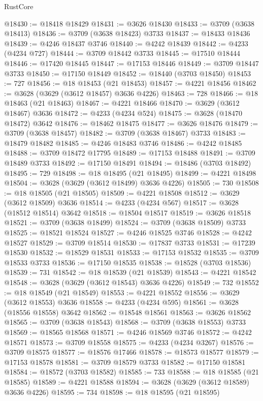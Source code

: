 \begin{lexlean}{RustCore}
\begin{coremodule}
@18430 := @18418 @18429
@18431 := @3626 @18430
@18433 := @3709 (@3638 @18413)
@18436 := @3709 (@3638 @18423) @3733
@18437 := @18433 @18436
@18439 := @4246 @18437 @3746
@18440 := @4242 @18439
@18442 := @4233 (@4234 @727)
@18444 := @3709 @18442 @3733
@18445 := @17510 @18444
@18446 := @17420 @18445
@18447 := @17153 @18446
@18449 := @3709 @18447 @3733
@18450 := @17150 @18449
@18452 := @18440 (@3703 @18450)
@18453 := 727
@18456 := @18 @18453 (@21 @18453)
@18457 := @4221 @18456
@18462 := @3628 (@3629 (@3612 @18457) @3636 @4226)
@18463 := 728
@18466 := @18 @18463 (@21 @18463)
@18467 := @4221 @18466
@18470 := @3629 (@3612 @18467) @3636
@18472 := @4233 (@4234 @524)
@18475 := @3628 (@18470 @18472) @3642
@18476 := @18462 @18475
@18477 := @3626 @18476
@18479 := @3709 (@3638 @18457)
@18482 := @3709 (@3638 @18467) @3733
@18483 := @18479 @18482
@18485 := @4246 @18483 @3746
@18486 := @4242 @18485
@18488 := @3709 @18472 @17795
@18489 := @17153 @18488
@18491 := @3709 @18489 @3733
@18492 := @17150 @18491
@18494 := @18486 (@3703 @18492)
@18495 := 729
@18498 := @18 @18495 (@21 @18495)
@18499 := @4221 @18498
@18504 := @3628 (@3629 (@3612 @18499) @3636 @4226)
@18505 := 730
@18508 := @18 @18505 (@21 @18505)
@18509 := @4221 @18508
@18512 := @3629 (@3612 @18509) @3636
@18514 := @4233 (@4234 @567)
@18517 := @3628 (@18512 @18514) @3642
@18518 := @18504 @18517
@18519 := @3626 @18518
@18521 := @3709 (@3638 @18499)
@18524 := @3709 (@3638 @18509) @3733
@18525 := @18521 @18524
@18527 := @4246 @18525 @3746
@18528 := @4242 @18527
@18529 := @3709 @18514
@18530 := @17837 @3733
@18531 := @17239 @18530
@18532 := @18529 @18531
@18533 := @17153 @18532
@18535 := @3709 @18533 @3733
@18536 := @17150 @18535
@18538 := @18528 (@3703 @18536)
@18539 := 731
@18542 := @18 @18539 (@21 @18539)
@18543 := @4221 @18542
@18548 := @3628 (@3629 (@3612 @18543) @3636 @4226)
@18549 := 732
@18552 := @18 @18549 (@21 @18549)
@18553 := @4221 @18552
@18556 := @3629 (@3612 @18553) @3636
@18558 := @4233 (@4234 @595)
@18561 := @3628 (@18556 @18558) @3642
@18562 := @18548 @18561
@18563 := @3626 @18562
@18565 := @3709 (@3638 @18543)
@18568 := @3709 (@3638 @18553) @3733
@18569 := @18565 @18568
@18571 := @4246 @18569 @3746
@18572 := @4242 @18571
@18573 := @3709 @18558
@18575 := @4233 (@4234 @3267)
@18576 := @3709 @18575
@18577 := @18576 @17466
@18578 := @18573 @18577
@18579 := @17153 @18578
@18581 := @3709 @18579 @3733
@18582 := @17150 @18581
@18584 := @18572 (@3703 @18582)
@18585 := 733
@18588 := @18 @18585 (@21 @18585)
@18589 := @4221 @18588
@18594 := @3628 (@3629 (@3612 @18589) @3636 @4226)
@18595 := 734
@18598 := @18 @18595 (@21 @18595)

\end{coremodule}
\end{lexlean}

